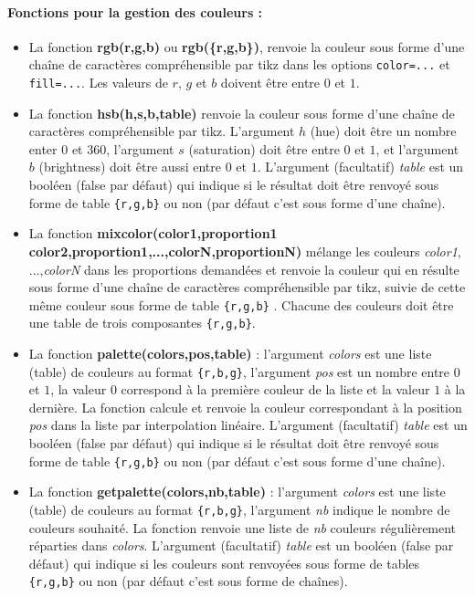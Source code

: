 \paragraph{Fonctions pour la gestion des couleurs :}
\begin{itemize}
    \item La fonction \textbf{rgb(r,g,b)} ou \textbf{rgb(\{r,g,b\})}, renvoie la couleur sous forme d'une chaîne de caractères compréhensible par tikz dans les options \verb|color=...| et \verb|fill=...|. Les valeurs de $r$, $g$ et $b$ doivent être entre $0$ et $1$.
    
    \item La fonction \textbf{hsb(h,s,b,table)} renvoie la couleur sous forme d'une chaîne de caractères compréhensible par tikz. L'argument $h$ (hue) doit être un nombre enter $0$ et $360$, l'argument $s$ (saturation) doit être entre $0$ et $1$, et l'argument $b$ (brightness) doit être aussi entre $0$ et $1$.
    L'argument (facultatif) \emph{table} est un booléen (false par défaut) qui indique si le résultat doit être renvoyé sous forme de table \verb|{r,g,b}| ou non (par défaut c'est sous forme d'une chaîne).
    
    \item La fonction \textbf{mixcolor(color1,proportion1 color2,proportion1,...,colorN,proportionN)} mélange les couleurs \emph{color1}, ...,\emph{colorN} dans les proportions demandées et renvoie la couleur qui en résulte sous forme d'une chaîne de caractères compréhensible par tikz, suivie de cette même couleur sous forme de table \verb|{r,g,b}| . Chacune des couleurs doit être une table de trois composantes \verb|{r,g,b}|.
    
    \item La fonction \textbf{palette(colors,pos,table)} : l'argument \emph{colors} est une liste (table) de couleurs au format \verb|{r,b,g}|, l'argument \emph{pos} est un nombre entre $0$ et $1$, la valeur $0$ correspond à la première couleur de la liste et la valeur $1$ à la dernière. La fonction calcule et renvoie la couleur correspondant à la position \emph{pos} dans la liste par interpolation linéaire. L'argument (facultatif) \emph{table} est un booléen (false par défaut) qui indique si le résultat doit être renvoyé sous forme de table \verb|{r,g,b}| ou non (par défaut c'est sous forme d'une chaîne).
    
    \item La fonction \textbf{getpalette(colors,nb,table)} : l'argument \emph{colors} est une liste (table) de couleurs au format \verb|{r,b,g}|, l'argument \emph{nb} indique le nombre de couleurs souhaité. La fonction renvoie une liste de \emph{nb} couleurs régulièrement réparties dans \emph{colors}. L'argument (facultatif) \emph{table} est un booléen (false par défaut) qui indique si les couleurs sont renvoyées sous forme de tables \verb|{r,g,b}| ou non (par défaut c'est sous forme de chaînes).  
    

\end{itemize}
